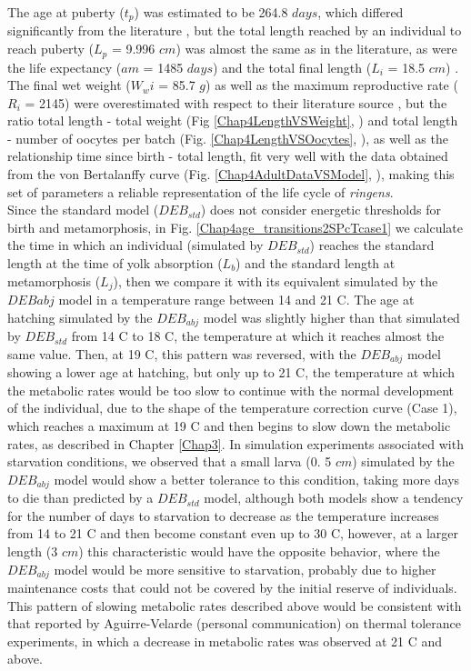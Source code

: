 The age at puberty ($t_{p}$) was estimated to be 264.8 $days$, which differed significantly from the literature \citep{MarzShin2009}, but the total length reached by an individual to reach puberty ($L_p$ = 9.996 $cm$) was almost the same as in the literature, as were the life expectancy ($am$ = 1485 $days$) and the total final length ($L_i$ = 18.5 $cm$) \citep{MarzShin2009}. The final wet weight ($W_wi$ = 85.7 $g$) as well as the maximum reproductive rate ($R_{i}$ = 2145) were overestimated with respect to their literature source \citep{PaloMuck1987,PereBuit2000}, but the ratio total length - total weight (Fig \ref{Chap4LengthVSWeight}, \cite{Mina1968}) and total length - number of oocytes per batch (Fig. \ref{Chap4LengthVSOocytes}, \cite{PereBuit2000}), as well as the relationship time since birth - total length, fit very well with the data obtained from the von Bertalanffy curve (Fig. \ref{Chap4AdultDataVSModel}, \cite{PaloMuck1987}), making this set of parameters a reliable representation of the life cycle of \textit{\gls{ringens}}.\\

Since the standard model ($DEB_{std}$) does not consider energetic thresholds for birth and metamorphosis, in Fig. \ref{Chap4age_transitions2SPcTcase1} we calculate the time in which an individual (simulated by $DEB_{std}$) reaches the standard length at the time of yolk absorption ($L_{b}$) and the standard length at metamorphosis ($L_{j}$), then we compare it with its equivalent simulated by the $DEB{abj}$ model in a temperature range between 14 and 21 \textdegree C. The age at hatching simulated by the $DEB_{abj}$ model was slightly higher than that simulated by $DEB_{std}$ from 14 \textdegree C to 18 \textdegree C, the temperature at which it reaches almost the same value. Then, at 19 \textdegree C, this pattern was reversed, with the $DEB_{abj}$ model showing a lower age at hatching, but only up to 21 \textdegree C, the temperature at which the metabolic rates would be too slow to continue with the normal development of the individual, due to the shape of the temperature correction curve (Case 1), which reaches a maximum at 19 \textdegree C and then begins to slow down the metabolic rates, as described in Chapter \ref{Chap3}. In simulation experiments associated with starvation conditions, we observed that a small larva (0. 5 $cm$) simulated by the $DEB_{abj}$ model would show a better tolerance to this condition, taking more days to die than predicted by a $DEB_{std}$ model, although both models show a tendency for the number of days to starvation to decrease as the temperature increases from 14 to 21 \textdegree C and then become constant even up to 30 \textdegree C, however, at a larger length (3 $cm$) this characteristic would have the opposite behavior, where the $DEB_{abj}$ model would be more sensitive to starvation, probably due to higher maintenance costs that could not be covered by the initial reserve of individuals. This pattern of slowing metabolic rates described above would be consistent with that reported by Aguirre-Velarde (personal communication) on thermal tolerance experiments, in which a decrease in metabolic rates was observed at 21 \textdegree C and above.\\

\clearpage